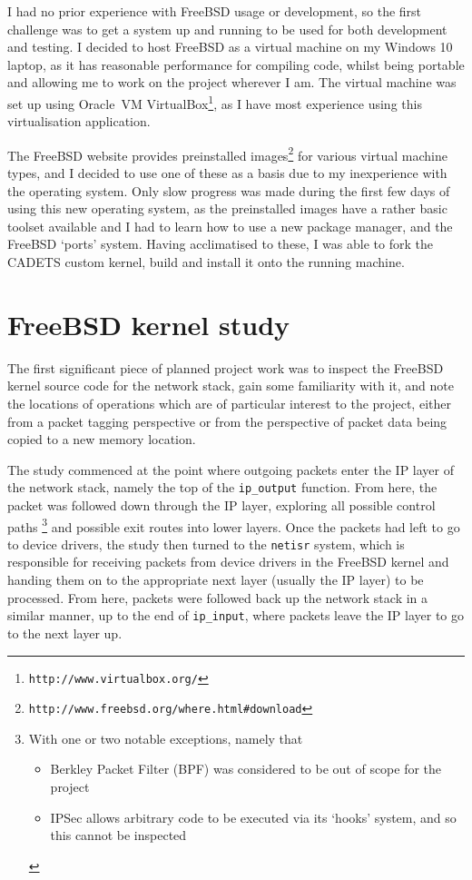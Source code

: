 \documentclass[a4paper,12pt,twoside,openright]{report}
\begin{document}
	I had no prior experience with FreeBSD usage or development, so the first challenge was to get a system up and running to be used for both development and testing. I decided to host FreeBSD as a virtual machine on my Windows 10 laptop, as it has reasonable performance for compiling code, whilst being portable and allowing me to work on the project wherever I am. The virtual machine was set up using Oracle\texttrademark\ VM VirtualBox\footnote{\texttt{http://www.virtualbox.org/}}, as I have most experience using this virtualisation application.
	
	The FreeBSD website provides preinstalled images\footnote{\texttt{http://www.freebsd.org/where.html\#download}} for various virtual machine types, and I decided to use one of these as a basis due to my inexperience with the operating system. Only slow progress was made during the first few days of using this new operating system, as the preinstalled images have a rather basic toolset available and I had to learn how to use a new package manager, and the FreeBSD `ports' system. Having acclimatised to these, I was able to fork the CADETS custom kernel, build and install it onto the running machine.
	
	\section{FreeBSD kernel study}
	
	The first significant piece of planned project work was to inspect the FreeBSD kernel source code for the network stack, gain some familiarity with it, and note the locations of operations which are of particular interest to the project, either from a packet tagging perspective or from the perspective of packet data being copied to a new memory location.
	
	The study commenced at the point where outgoing packets enter the IP layer of the network stack, namely the top of the \verb|ip_output| function. From here, the packet was followed down through the IP layer, exploring all possible control paths
	\footnote{
		With one or two notable exceptions, namely that
		\begin{itemize}
			\item Berkley Packet Filter (BPF) was considered to be out of scope for the project
			\item IPSec allows arbitrary code to be executed via its `hooks' system, and so this cannot be inspected
		\end{itemize}
	}
	and possible exit routes into lower layers. Once the packets had left to go to device drivers, the study then turned to the \texttt{netisr} system, which is responsible for receiving packets from device drivers in the FreeBSD kernel and handing them on to the appropriate next layer (usually the IP layer) to be processed. From here, packets were followed back up the network stack in a similar manner, up to the end of \verb|ip_input|, where packets leave the IP layer to go to the next layer up.
	
\end{document}
